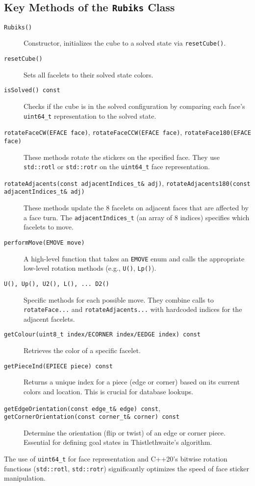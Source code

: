 \documentclass[11pt, a4paper]{article}
\begin{document}
\subsection{Key Methods of the \texttt{Rubiks} Class}
\begin{description}
    \item[\texttt{Rubiks()}] Constructor, initializes the cube to a solved state via \texttt{resetCube()}.
    \item[\texttt{resetCube()}] Sets all facelets to their solved state colors.
    \item[\texttt{isSolved() const}] Checks if the cube is in the solved configuration by comparing each face's \texttt{uint64\_t} representation to the solved state.
    \item[\texttt{rotateFaceCW(EFACE face)}, \texttt{rotateFaceCCW(EFACE face)}, \texttt{rotateFace180(EFACE face)}] These methods rotate the stickers on the specified face. They use \texttt{std::rotl} or \texttt{std::rotr} on the \texttt{uint64\_t} face representation.
    \item[\texttt{rotateAdjacents(const adjacentIndices\_t\& adj)}, \texttt{rotateAdjacents180(const adjacentIndices\_t\& adj)}] These methods update the 8 facelets on adjacent faces that are affected by a face turn. The \texttt{adjacentIndices\_t} (an array of 8 indices) specifies which facelets to move.
    \item[\texttt{performMove(EMOVE move)}] A high-level function that takes an \texttt{EMOVE} enum and calls the appropriate low-level rotation methods (e.g., \texttt{U()}, \texttt{Lp()}).
    \item[\texttt{U(), Up(), U2(), L(), ... D2()}] Specific methods for each possible move. They combine calls to \texttt{rotateFace...} and \texttt{rotateAdjacents...} with hardcoded indices for the adjacent facelets.
    \item[\texttt{getColour(uint8\_t index/ECORNER index/EEDGE index) const}] Retrieves the color of a specific facelet.
    \item[\texttt{getPieceInd(EPIECE piece) const}] Returns a unique index for a piece (edge or corner) based on its current colors and location. This is crucial for database lookups.
    \item[\texttt{getEdgeOrientation(const edge\_t\& edge) const}, \texttt{getCornerOrientation(const corner\_t\& corner) const}] Determine the orientation (flip or twist) of an edge or corner piece. Essential for defining goal states in Thistlethwaite's algorithm.
\end{description}
The use of \texttt{uint64\_t} for face representation and C++20's bitwise rotation functions (\texttt{std::rotl}, \texttt{std::rotr}) significantly optimizes the speed of face sticker manipulation.
\end{document}
